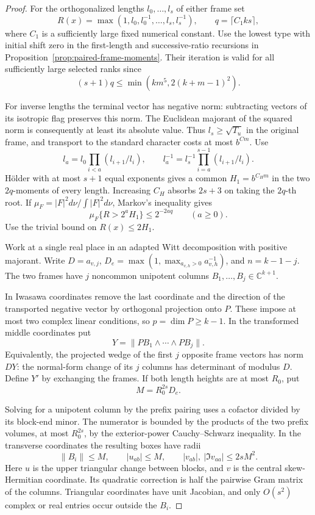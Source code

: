 \begin{proof}
For the orthogonalized lengths \(l_0,\ldots,l_s\) of either frame set
\[
 R(x)=\max(1,l_0,l_0^{-1},\ldots,l_s,l_s^{-1}),\qquad
 q=\lceil C_1ks\rceil ,
\]
where \(C_1\) is a sufficiently large fixed numerical constant. Use the lowest type with initial shift zero in the first-length and successive-ratio recursions in Proposition~\ref{prop:paired-frame-moments}. Their iteration is valid for all sufficiently large selected ranks since
\[
       (s+1)q\le\min(km^5,2(k+m-1)^2).
\]

 For inverse lengths the terminal vector has negative norm: subtracting vectors of its isotropic flag preserves this norm. The Euclidean majorant of the squared norm is consequently at least its absolute value. Thus \(l_s\ge \sqrt{T_u}\) in the original frame, and transport to the standard character costs at most \(b^{C m}\). Use
\[
 l_a=l_0\prod_{i<a}(l_{i+1}/l_i),\qquad
 l_a^{-1}=l_s^{-1}\prod_{i=a}^{s-1}(l_{i+1}/l_i).
\]
H\"older with at most \(s+1\) equal exponents gives a common \(H_1=b^{C_Hm}\) in the two \(2q\)-moments of every length. Increasing \(C_H\) absorbs \(2s+3\) on taking the \(2q\)-th root. If \(\mu_F=|F|^2d\nu/\int|F|^2d\nu\), Markov's inequality gives
\[
       \mu_F\{R>2^a H_1\}\le 2^{-2aq}\qquad(a\ge0).
\] Use the trivial bound on \(R(x)\le 2H_1\).

Work at a single real place in an adapted Witt decomposition with positive majorant. Write \(D=a_{v,j}\), \(D_e=\max(1,\max_{a_{v,h}>0}a_{v,h}^{-1})\), and \(n=k-1-j\). The two frames have \(j\) noncommon unipotent columns \(B_1,\ldots,B_j\in\mathbb C^{k+1}\). 

In Iwasawa coordinates remove the last coordinate and the direction of the transported negative vector by orthogonal projection onto \(P\). These impose at most two complex linear conditions, so \(p=\dim P\ge k-1\). In the transformed middle coordinates put
\[
 Y=\|P B_1\wedge\cdots\wedge P B_j\| .
\]
Equivalently, the projected wedge of the first \(j\) opposite frame vectors has norm \(DY\): the normal-form change of its \(j\) columns has determinant of modulus \(D\). Define \(Y'\) by exchanging the frames. If both length heights are at most \(R_0\), put
\[
                      M=R_0^{2s}D_e .
\]

 Solving for a unipotent column by the prefix pairing uses a cofactor divided by its block-end minor. The numerator is bounded by the products of the two prefix volumes, at most \(R_0^{2s}\), by the exterior-power Cauchy--Schwarz inequality. In the transverse coordinates the resulting boxes have radii
\[
   \|B_i\|\le M,\qquad |u_{ab}|\le M,\qquad
   |v_{ab}|,\ |\Im v_{aa}|\le 2sM^2 .
\]
Here \(u\) is the upper triangular change between blocks, and \(v\) is the central skew-Hermitian coordinate. Its quadratic correction is half the pairwise Gram matrix of the columns. Triangular coordinates have unit Jacobian, and only \(O(s^2)\) complex or real entries occur outside the \(B_i\).




\end{proof}
